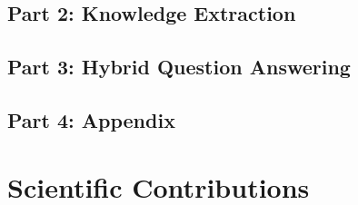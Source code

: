 \subsection{Part 2: Knowledge Extraction}



\subsection{Part 3: Hybrid Question Answering}

\subsection{Part 4: Appendix}


\section{Scientific Contributions}


